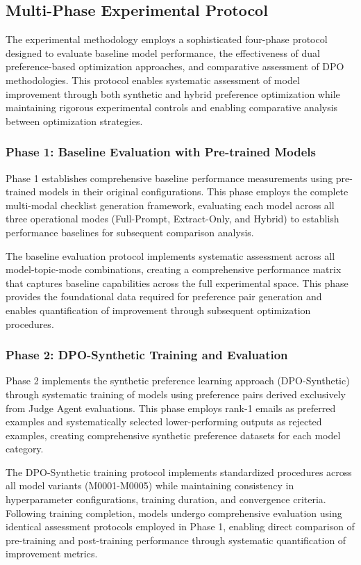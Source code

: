 \subsection{Multi-Phase Experimental Protocol}

The experimental methodology employs a sophisticated four-phase protocol designed to evaluate baseline model performance, the effectiveness of dual preference-based optimization approaches, and comparative assessment of DPO methodologies. This protocol enables systematic assessment of model improvement through both synthetic and hybrid preference optimization while maintaining rigorous experimental controls and enabling comparative analysis between optimization strategies.

\subsubsection{Phase 1: Baseline Evaluation with Pre-trained Models}

Phase 1 establishes comprehensive baseline performance measurements using pre-trained models in their original configurations. This phase employs the complete multi-modal checklist generation framework, evaluating each model across all three operational modes (Full-Prompt, Extract-Only, and Hybrid) to establish performance baselines for subsequent comparison analysis.

The baseline evaluation protocol implements systematic assessment across all model-topic-mode combinations, creating a comprehensive performance matrix that captures baseline capabilities across the full experimental space. This phase provides the foundational data required for preference pair generation and enables quantification of improvement through subsequent optimization procedures.

\subsubsection{Phase 2: DPO-Synthetic Training and Evaluation}

Phase 2 implements the synthetic preference learning approach (DPO-Synthetic) through systematic training of models using preference pairs derived exclusively from Judge Agent evaluations. This phase employs rank-1 emails as preferred examples and systematically selected lower-performing outputs as rejected examples, creating comprehensive synthetic preference datasets for each model category.

The DPO-Synthetic training protocol implements standardized procedures across all model variants (M0001-M0005) while maintaining consistency in hyperparameter configurations, training duration, and convergence criteria. Following training completion, models undergo comprehensive evaluation using identical assessment protocols employed in Phase 1, enabling direct comparison of pre-training and post-training performance through systematic quantification of improvement metrics.

